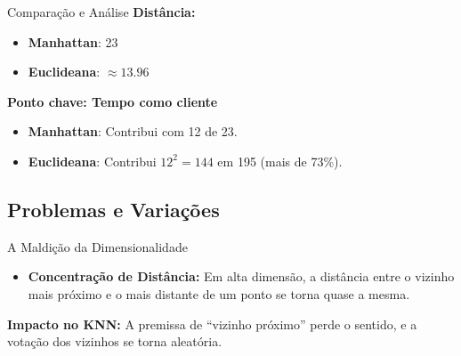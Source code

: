 \documentclass{beamer}
\begin{document}
\begin{frame}{Comparação e Análise}
\textbf{Distância:}
\begin{itemize}
    \item \textbf{Manhattan}: 23
    \item \textbf{Euclideana}: $\approx 13.96$
\end{itemize}

\textbf{Ponto chave: Tempo como cliente}
\begin{itemize}
    \item \textbf{Manhattan}: Contribui com 12 de 23.
    \item \textbf{Euclideana}: Contribui $12^2 = 144$ em 195 (mais de  73\%).
\end{itemize}


\end{frame}



\subsection{Problemas e Variações}

\begin{frame}{A Maldição da Dimensionalidade}

    \begin{itemize}

        \item \textbf{Concentração de Distância:} Em alta dimensão, a distância entre o vizinho mais próximo e o mais distante de um ponto se torna quase a mesma.
    \end{itemize}
    \vspace{0.5cm}
    \textbf{Impacto no KNN:} A premissa de ``vizinho próximo'' perde o sentido, e a votação dos vizinhos se torna aleatória.
\end{frame}
\end{document}
